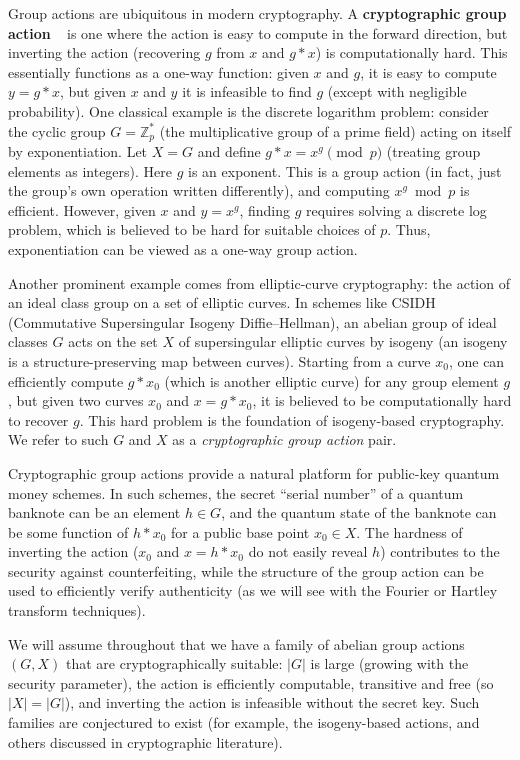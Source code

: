 \documentclass[12pt]{report}
\begin{document}
Group actions are ubiquitous in modern cryptography. A \textbf{cryptographic group action} ~\cite{Castryck2020} is one where the action is easy to compute in the forward direction, but inverting the action (recovering $g$ from $x$ and $g*x$) is computationally hard. This essentially functions as a one-way function: given $x$ and $g$, it is easy to compute $y = g*x$, but given $x$ and $y$ it is infeasible to find $g$ (except with negligible probability). One classical example is the discrete logarithm problem: consider the cyclic group $G = \mathbb{Z}_p^*$ (the multiplicative group of a prime field) acting on itself by exponentiation. Let $X = G$ and define $g * x = x^g \pmod p$ (treating group elements as integers). Here $g$ is an exponent. This is a group action (in fact, just the group’s own operation written differently), and computing $x^g \bmod p$ is efficient. However, given $x$ and $y = x^g$, finding $g$ requires solving a discrete log problem, which is believed to be hard for suitable choices of $p$. Thus, exponentiation can be viewed as a one-way group action.

Another prominent example comes from elliptic-curve cryptography: the action of an ideal class group on a set of elliptic curves. In schemes like CSIDH (Commutative Supersingular Isogeny Diffie–Hellman), an abelian group of ideal classes $G$ acts on the set $X$ of supersingular elliptic curves by isogeny (an isogeny is a structure-preserving map between curves). Starting from a curve $x_0$, one can efficiently compute $g * x_0$ (which is another elliptic curve) for any group element $g$, but given two curves $x_0$ and $x = g * x_0$, it is believed to be computationally hard to recover $g$. This hard problem is the foundation of isogeny-based cryptography. We refer to such $G$ and $X$ as a \emph{cryptographic group action} pair.

Cryptographic group actions provide a natural platform for public-key quantum money schemes. In such schemes, the secret “serial number” of a quantum banknote can be an element $h \in G$, and the quantum state of the banknote can be some function of $h*x_0$ for a public base point $x_0 \in X$. The hardness of inverting the action ($x_0$ and $x = h*x_0$ do not easily reveal $h$) contributes to the security against counterfeiting, while the structure of the group action can be used to efficiently verify authenticity (as we will see with the Fourier or Hartley transform techniques).

We will assume throughout that we have a family of abelian group actions $(G,X)$ that are cryptographically suitable: $|G|$ is large (growing with the security parameter), the action is efficiently computable, transitive and free (so $|X|=|G|$), and inverting the action is infeasible without the secret key. Such families are conjectured to exist (for example, the isogeny-based actions, and others discussed in cryptographic literature). 
\end{document}
